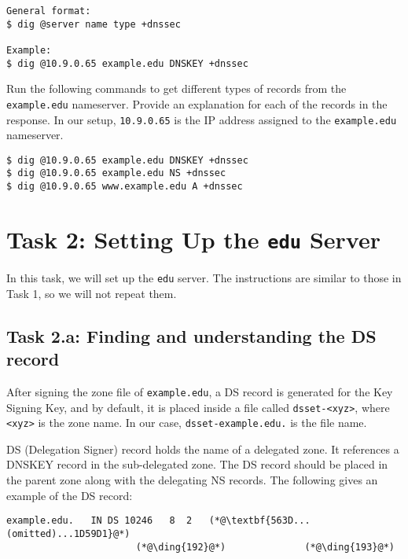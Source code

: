 \begin{lstlisting}
General format:
$ dig @server name type +dnssec

Example:
$ dig @10.9.0.65 example.edu DNSKEY +dnssec
\end{lstlisting}
 

Run the following commands to get different types of records 
from the \texttt{example.edu} nameserver. Provide an explanation
for each of the records in the response. 
In our setup, \texttt{10.9.0.65} is the IP address 
assigned to the \texttt{example.edu} nameserver.

\begin{lstlisting}
$ dig @10.9.0.65 example.edu DNSKEY +dnssec
$ dig @10.9.0.65 example.edu NS +dnssec
$ dig @10.9.0.65 www.example.edu A +dnssec
\end{lstlisting}
 


\section{Task 2: Setting Up the \texttt{edu} Server}


In this task, we will set up the \texttt{edu} server. 
The instructions are similar to those in Task 1, so we will not repeat them. 


\subsection{Task 2.a: Finding and understanding the DS record}


After signing the zone file of \texttt{example.edu}, a DS record is generated for the Key
Signing Key, and by default, it is placed inside a file called \texttt{dsset-<xyz>}, where
\texttt{<xyz>} is the zone name. In our case, \texttt{dsset-example.edu.} is the file name.


DS (Delegation Signer) record holds the name of a delegated zone. It 
references a DNSKEY record in the sub-delegated zone. 
The DS record should be placed in the parent zone along with the delegating NS records.
The following gives an example of the DS record:


\begin{lstlisting}
example.edu.   IN DS 10246   8  2   (*@\textbf{563D...(omitted)...1D59D1}@*)
                       (*@\ding{192}@*)              (*@\ding{193}@*)
\end{lstlisting}


